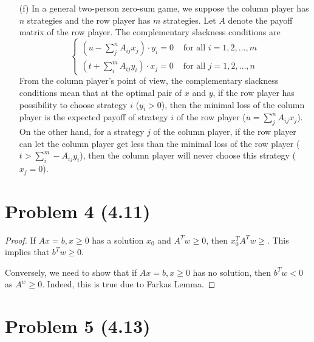 \documentclass[12pt]{article}
\begin{document}
\begin{itemize}
	\item[(f)] In a general two-person zero-sum game, we suppose the column player has $n$ strategies and the row player has $m$ strategies. Let $A$ denote the payoff matrix of the row player. The complementary slackness conditions are
	\[\begin{cases}
	(u - \sum_{j}^{n} A_{ij}x_{j})\cdot y_i = 0 & \text{ for all } i=1,2,\ldots,m\\
	(t + \sum_{i}^{m} A_{ij}y_{i})\cdot x_j = 0 & \text{ for all } j=1,2,\ldots,n
	\end{cases}\]
	From the column player's point of view, the complementary slackness conditions mean that at the optimal pair of $x$ and $y$, if the row player has possibility to choose strategy $i$ ($y_i>0$), then the minimal loss of the column player is the expected payoff of strategy $i$ of
	the row player ($u = \sum_{j}^{n} A_{ij}x_{j}$). On the other hand, for a strategy $j$ of the column player, if the row player can let the column player get less than the minimal loss of the row player ($t > \sum_{i}^{m} -A_{ij}y_{i}$), then the column player will never choose this strategy ($x_j=0$).
\end{itemize}

\section*{Problem 4 (4.11)}


\begin{proof}

If $Ax = b, x\geqslant 0$ has a solution $x_0$ and $A^Tw \geqslant 0$, then $x_0^TA^Tw \geqslant$. This implies that $b^Tw\geqslant 0$.

Conversely, we need to show that if $Ax = b, x\geqslant 0$ has no solution, then $b^Tw <0$ as $A^w \geqslant 0$. Indeed, this is true due to Farkas Lemma.

\end{proof}

\section*{Problem 5 (4.13)}
\end{document}
